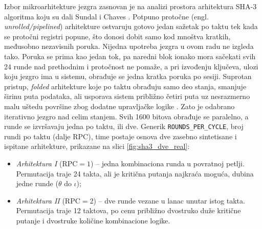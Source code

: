 Izbor mikroarhitekture jezgra zasnovan je na analizi prostora arhitektura SHA-3 algoritma koju su dali Sundal i Chaves \cite{sundal_chaves}. Potpuno protočne (engl. \textit{unrolled/pipelined}) arhitekture ostvaruju gotovo jedan sažetak po taktu tek kada se protočni registri popune, što donosi dobit samo kod mnoštva kratkih, međusobno nezavisnih poruka. Nijedna upotreba jezgra u ovom radu ne izgleda tako. Poruka se prima kao jedan tok, pa naredni blok ionako mora sačekati svih 24 runde nad prethodnim i protočnost ne pomaže, a pri izvođenju ključeva, ulozi koju jezgro ima u sistemu, obrađuje se jedna kratka poruka po sesiji. Suprotan pristup, \textit{folded} arhitekture koje po taktu obrađuju samo deo stanja, smanjuje širinu puta podataka, ali usporava sistem približno četiri puta uz nesrazmerno malu uštedu površine zbog dodatne upravljačke logike \cite{sundal_chaves}. Zato je odabrano iterativno jezgro nad celim stanjem. Svih 1600 bitova obrađuje se paralelno, a runde se izvršavaju jedna po taktu, ili dve. Generik \texttt{ROUNDS\_PER\_CYCLE}, broj rundi po taktu (dalje $\mathrm{RPC}$), time postaje osnova dve zasebno sintetisane i ispitane arhitekture, prikazane na slici \ref{fig:sha3_dve_real}:
\begin{itemize}[itemsep=2pt]
    \item \textit{Arhitektura I} ($\mathrm{RPC}=1$) -- jedna kombinaciona runda u povratnoj petlji. Permutacija traje 24 takta, ali je kritična putanja najkraća moguća, dubina jedne runde ($\theta$ do $\iota$);
    \item \textit{Arhitektura II} ($\mathrm{RPC}=2$) -- dve runde vezane u lanac unutar istog takta. Permutacija traje 12 taktova, po cenu približno dvostruko duže kritične putanje i dvostruke količine kombinacione logike.
\end{itemize}

